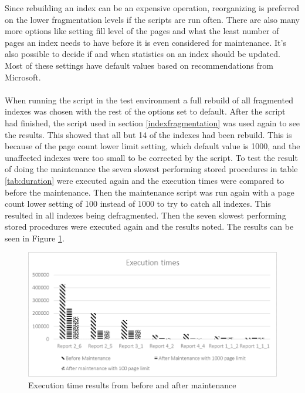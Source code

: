 \documentclass{cslthse-msc}
\begin{document}
Since rebuilding an index can be an expensive operation, reorganizing is preferred on the lower fragmentation levels if the scripts are run often. There are also many more options like setting fill level of the pages and what the least number of pages an index needs to have before it is even considered for maintenance. It's also possible to decide if and when statistics on an index should be updated. Most of these settings have default values based on recommendations from Microsoft.\\\\
When running the script in the test environment a full rebuild of all fragmented indexes was chosen with the rest of the options set to default. After the script had finished, the script used in section \ref{indexfragmentation} was used again to see the results. This showed that all but 14 of the indexes had been rebuild. This is because of the page count lower limit setting, which default value is 1000, and the unaffected indexes were too small to be corrected by the script. To test the result of doing the maintenance the seven slowest performing stored procedures in table \ref{tab:duration} were executed again and the execution times were compared to before the maintenance. Then the maintenance script was run again with a page count lower setting of 100 instead of 1000 to try to catch all indexes. This resulted in all indexes being defragmented. Then the seven slowest performing stored procedures were executed again and the results noted. The results can be seen in Figure \ref{fig:beforeafter}.

\begin{figure}[H]
\begin{center}
\includegraphics[scale=1]{Pictures/beforeAndAfterMaintenance.png}
\caption{Execution time results from before and after maintenance}
\label{fig:beforeafter}
\end{center}
\end{figure} 
\end{document}
